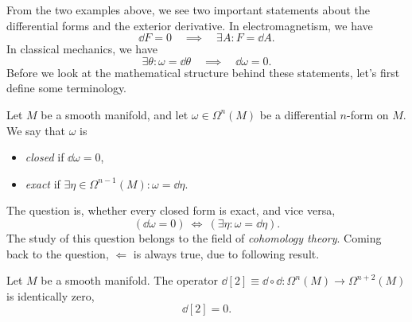 From the two examples above, we see two important statements about the differential forms and the exterior derivative. In electromagnetism, we have
\begin{equation*}
    \dd F = 0 \quad \implies \quad \exists A : F = \dd A.
\end{equation*}
In classical mechanics, we have
\begin{equation*}
    \exists \theta : \omega = \dd \theta \quad \implies \quad \dd \omega = 0.
\end{equation*}
Before we look at the mathematical structure behind these statements, let's first define some terminology.
\begin{definition}
    Let \(M\) be a smooth manifold, and let \(\omega \in \Omega^n(M)\) be a differential \(n\)-form on \(M\). We say that \(\omega\) is
    \begin{itemize}
        \item \emph{closed} if \(\dd{\omega} = 0\),
        \item \emph{exact} if \(\exists \eta \in \Omega^{n-1}(M): \omega = \dd{\eta}\).
    \end{itemize}
\end{definition}
The question is, whether every closed form is exact, and vice versa, \ie
\begin{equation*}
    (\dd{\omega} = 0) \ \Leftrightarrow \ (\exists \eta: \omega = \dd{\eta}).
\end{equation*}
The study of this question belongs to the field of \emph{cohomology theory}. Coming back to the question, \(\Leftarrow\) is always true, due to following result.
\begin{theorem}
    Let \(M\) be a smooth manifold. The operator \(\dd[2] \equiv \dd \circ \dd: \Omega^n(M) \to \Omega^{n+2}(M)\) is identically zero, \ie
    \begin{equation*}
        \dd[2] = 0.
    \end{equation*}
\end{theorem}
